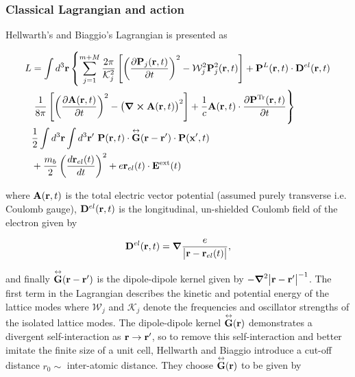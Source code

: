 \subsubsection{Classical Lagrangian and action}

Hellwarth's and Biaggio's Lagrangian is presented as

\begin{equation} \label{eqn:hi_lag}
    \begin{aligned}
        L &= \int d^3 \vb{r} \left\{ \sum_{j = 1}^{m+M} \frac{2\pi}{\mathcal{K}_j^2} \left[ \left( \frac{\partial \vb{P}_j(\vb{r}, t)}{\partial t} \right)^2 - \mathcal{W}_j^2 \vb{P}_j^2(\vb{r}, t)\right] + \vb{P}^L(\vb{r}, t) \cdot \vb{D}^{el}(\vb{r}, t) \right. \\
        &\left. \frac{1}{8\pi} \left[ \left( \frac{\partial \vb{A}(\vb{r}, t)}{\partial t} \right)^2 - \left( \curl{\vb{A}(\vb{r}, t)} \right)^2 \right] + \frac{1}{c} \vb{A}(\vb{r}, t) \cdot \frac{\partial \vb{P}^{\text{Tr}}(\vb{r}, t)}{\partial t} \right\} \\
        &\frac{1}{2} \int d^3\vb{r} \int d^3\vb{r'}\ \vb{P}(\vb{r}, t) \cdot \overset{\leftrightarrow}{\vb{G}}(\vb{r} - \vb{r'}) \cdot \vb{P}(\vb{x'}, t) \\
        &+\frac{m_b}{2} \left( \frac{d \vb{r}_{el}(t)}{dt} \right)^2 + e \vb{r}_{el}(t) \cdot \vb{E}^{\text{ext}}(t)
    \end{aligned}
\end{equation}

where $\vb{A}(\vb{r}, t)$ is the total electric vector potential (assumed purely transverse i.e. Coulomb gauge), $\vb{D}^{el}(\vb{r}, t)$ is the longitudinal, un-shielded Coulomb field of the electron given by

\begin{equation}
    \vb{D}^{el}(\vb{r}, t) = \grad \frac{e}{\abs{\vb{r} - \vb{r}_{el}(t)}},
\end{equation}

and finally $\overset{\leftrightarrow}{\vb{G}}(\vb{r} - \vb{r'})$ is the dipole-dipole kernel given by $-\grad^2 \abs{\vb{r} - \vb{r}'}^{-1}$. The first term in the Lagrangian describes the kinetic and potential energy of the lattice modes where $\mathcal{W}_j$ and  $\mathcal{K}_j$ denote the frequencies and oscillator strengths of the isolated lattice modes. The dipole-dipole kernel $\overset{\leftrightarrow}{\vb{G}}(\vb{r})$ demonstrates a divergent self-interaction as $\vb{r} \to \vb{r'}$, so to remove this self-interaction and better imitate the finite size of a unit cell, Hellwarth and Biaggio introduce a cut-off distance $r_0 \sim$ inter-atomic distance. They choose $\overset{\leftrightarrow}{\vb{G}}(\vb{r})$ to be given by

